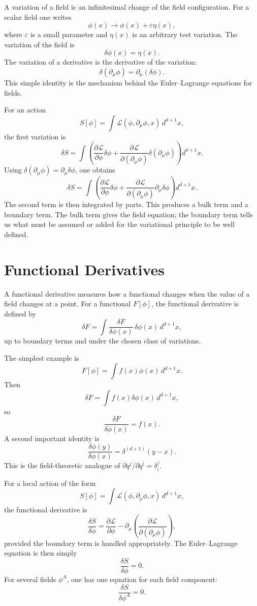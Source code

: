 A variation of a field is an infinitesimal change of the field configuration.
For a scalar field one writes
\[
    \phi(x) \longrightarrow \phi(x)+\varepsilon\eta(x),
\]
where \(\varepsilon\) is a small parameter and \(\eta(x)\) is an arbitrary test
variation. The variation of the field is
\[
    \delta\phi(x)=\eta(x).
\]
The variation of a derivative is the derivative of the variation:
\[
    \delta(\partial_\mu\phi)=\partial_\mu(\delta\phi).
\]
This simple identity is the mechanism behind the Euler--Lagrange equations for
fields.

For an action
\[
    S[\phi]=\int \mathcal{L}(\phi,\partial_\mu\phi,x)\,d^{d+1}x,
\]
the first variation is
\[
    \delta S
    = \int \left(
        \frac{\partial\mathcal{L}}{\partial\phi}\delta\phi
        + \frac{\partial\mathcal{L}}{\partial(\partial_\mu\phi)}
          \delta(\partial_\mu\phi)
    \right)d^{d+1}x.
\]
Using \(\delta(\partial_\mu\phi)=\partial_\mu\delta\phi\), one obtains
\[
    \delta S
    = \int \left(
        \frac{\partial\mathcal{L}}{\partial\phi}\delta\phi
        + \frac{\partial\mathcal{L}}{\partial(\partial_\mu\phi)}
          \partial_\mu\delta\phi
    \right)d^{d+1}x.
\]
The second term is then integrated by parts. This produces a bulk term and a
boundary term. The bulk term gives the field equation; the boundary term tells
us what must be assumed or added for the variational principle to be well
defined.

\section{Functional Derivatives}

A functional derivative measures how a functional changes when the value of a
field changes at a point. For a functional \(F[\phi]\), the functional derivative
is defined by
\[
    \delta F
    = \int \frac{\delta F}{\delta\phi(x)}\,\delta\phi(x)\,d^{d+1}x,
\]
up to boundary terms and under the chosen class of variations.

The simplest example is
\[
    F[\phi] = \int f(x)\phi(x)\,d^{d+1}x.
\]
Then
\[
    \delta F = \int f(x)\delta\phi(x)\,d^{d+1}x,
\]
so
\[
    \frac{\delta F}{\delta\phi(x)} = f(x).
\]
A second important identity is
\[
    \frac{\delta\phi(y)}{\delta\phi(x)} = \delta^{(d+1)}(y-x).
\]
This is the field-theoretic analogue of
\(\partial q^j/\partial q^i=\delta^j_i\).

For a local action of the form
\[
    S[\phi]=\int \mathcal{L}(\phi,\partial_\mu\phi,x)\,d^{d+1}x,
\]
the functional derivative is
\[
    \frac{\delta S}{\delta\phi}
    = \frac{\partial\mathcal{L}}{\partial\phi}
      - \partial_\mu\left(
        \frac{\partial\mathcal{L}}{\partial(\partial_\mu\phi)}
      \right),
\]
provided the boundary term is handled appropriately. The Euler--Lagrange
equation is then simply
\[
    \frac{\delta S}{\delta\phi}=0.
\]
For several fields \(\phi^A\), one has one equation for each field component:
\[
    \frac{\delta S}{\delta\phi^A}=0.
\]

